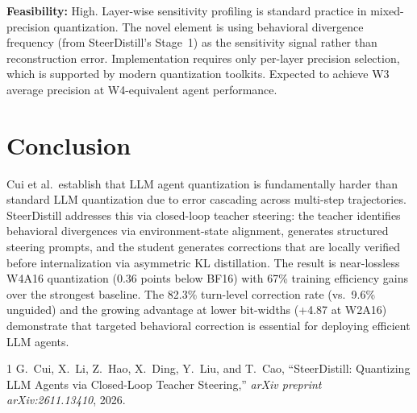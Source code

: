 \documentclass[11pt,a4paper]{article}
\begin{document}
\textbf{Feasibility:} High. Layer-wise sensitivity profiling is standard practice in mixed-precision quantization. The novel element is using behavioral divergence frequency (from SteerDistill's Stage~1) as the sensitivity signal rather than reconstruction error. Implementation requires only per-layer precision selection, which is supported by modern quantization toolkits. Expected to achieve W3 average precision at W4-equivalent agent performance.

\section{Conclusion}
Cui et al.\ establish that LLM agent quantization is fundamentally harder than standard LLM quantization due to error cascading across multi-step trajectories. SteerDistill addresses this via closed-loop teacher steering: the teacher identifies behavioral divergences via environment-state alignment, generates structured steering prompts, and the student generates corrections that are locally verified before internalization via asymmetric KL distillation. The result is near-lossless W4A16 quantization (0.36 points below BF16) with 67\% training efficiency gains over the strongest baseline. The 82.3\% turn-level correction rate (vs.\ 9.6\% unguided) and the growing advantage at lower bit-widths (+4.87 at W2A16) demonstrate that targeted behavioral correction is essential for deploying efficient LLM agents.

\begin{thebibliography}{1}
G.~Cui, X.~Li, Z.~Hao, X.~Ding, Y.~Liu, and T.~Cao,
``SteerDistill: Quantizing LLM Agents via Closed-Loop Teacher Steering,''
\textit{arXiv preprint arXiv:2611.13410}, 2026.
\end{thebibliography}
\end{document}
